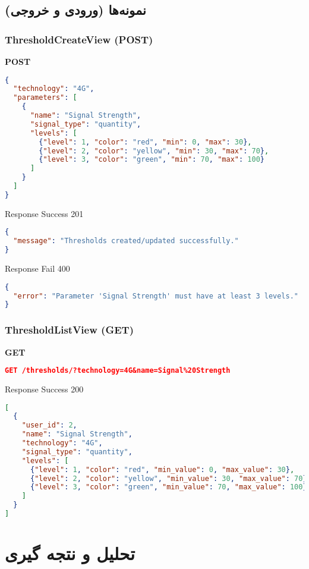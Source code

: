 \documentclass{report}
\begin{document}
\section{نمونه‌ها (ورودی و خروجی)}

\subsection{ThresholdCreateView (POST)}
\textbf{POST}
\begin{lstlisting}[language=json]
{
  "technology": "4G",
  "parameters": [
    {
      "name": "Signal Strength",
      "signal_type": "quantity",
      "levels": [
        {"level": 1, "color": "red", "min": 0, "max": 30},
        {"level": 2, "color": "yellow", "min": 30, "max": 70},
        {"level": 3, "color": "green", "min": 70, "max": 100}
      ]
    }
  ]
}
\end{lstlisting}

Response Success 201
\begin{lstlisting}[language=json]
{
  "message": "Thresholds created/updated successfully."
}
\end{lstlisting}

Response Fail 400
\begin{lstlisting}[language=json]
{
  "error": "Parameter 'Signal Strength' must have at least 3 levels."
}
\end{lstlisting}

\subsection{ThresholdListView (GET)}
\textbf{GET}
\begin{lstlisting}[language=json]
GET /thresholds/?technology=4G&name=Signal%20Strength
\end{lstlisting}

Response Success 200
\begin{lstlisting}[language=json]
[
  {
    "user_id": 2,
    "name": "Signal Strength",
    "technology": "4G",
    "signal_type": "quantity",
    "levels": [
      {"level": 1, "color": "red", "min_value": 0, "max_value": 30},
      {"level": 2, "color": "yellow", "min_value": 30, "max_value": 70},
      {"level": 3, "color": "green", "min_value": 70, "max_value": 100}
    ]
  }
]
\end{lstlisting}


\chapter{ }

\section{ }

\section{ }

\chapter{تحلیل و نتجه گیری}
 
\end{document}
